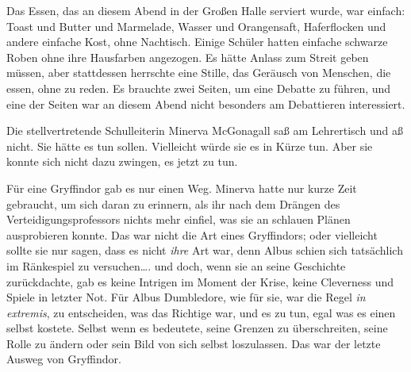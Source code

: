 Das Essen, das an diesem Abend in der Großen Halle serviert wurde, war einfach: Toast und Butter und Marmelade, Wasser und Orangensaft, Haferflocken und andere einfache Kost, ohne Nachtisch. Einige Schüler hatten einfache schwarze Roben ohne ihre Hausfarben angezogen. Es hätte Anlass zum Streit geben müssen, aber stattdessen herrschte eine Stille, das Geräusch von Menschen, die essen, ohne zu reden. Es brauchte zwei Seiten, um eine Debatte zu führen, und eine der Seiten war an diesem Abend nicht besonders am Debattieren interessiert.

Die stellvertretende Schulleiterin Minerva McGonagall saß am Lehrertisch und aß nicht. Sie hätte es tun sollen. Vielleicht würde sie es in Kürze tun. Aber sie konnte sich nicht dazu zwingen, es jetzt zu tun.

Für eine Gryffindor gab es nur einen Weg.
Minerva hatte nur kurze Zeit gebraucht, um sich daran zu erinnern, als ihr nach dem Drängen des Verteidigungsprofessors nichts mehr einfiel, was sie an schlauen Plänen ausprobieren konnte. Das war nicht die Art eines Gryffindors; oder vielleicht sollte sie nur sagen, dass es nicht \emph{ihre} Art war, denn Albus schien sich tatsächlich im Ränkespiel zu versuchen…. und doch, wenn sie an seine Geschichte zurückdachte, gab es keine Intrigen im Moment der Krise, keine Cleverness und Spiele in letzter Not. Für Albus Dumbledore, wie für sie, war die Regel \emph{in extremis}, zu entscheiden, was das Richtige war, und es zu tun, egal was es einen selbst kostete. Selbst wenn es bedeutete, seine Grenzen zu überschreiten, seine Rolle zu ändern oder sein Bild von sich selbst loszulassen. Das war der letzte Ausweg von Gryffindor.

